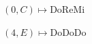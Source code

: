 \documentclass[preview]{standalone}
\begin{document}
\begin{center}
$(0,C) \mapsto$DoReMi

$(4,E) \mapsto$DoDoDo
\end{center}
\end{document}
